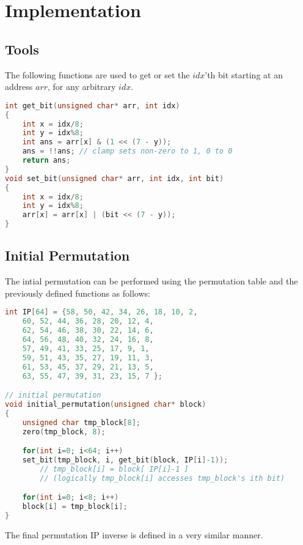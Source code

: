 \documentclass{article}
\begin{document}


\section{Implementation}
\subsection{Tools}
The following functions are used to get or set the $idx$'th bit starting at an address $arr$, for any arbitrary $idx$.
\begin{lstlisting}[language=c]
int get_bit(unsigned char* arr, int idx)
{
    int x = idx/8;
    int y = idx%8;
    int ans = arr[x] & (1 << (7 - y));
    ans = !!ans; // clamp sets non-zero to 1, 0 to 0
    return ans;
}
void set_bit(unsigned char* arr, int idx, int bit)
{
    int x = idx/8;
    int y = idx%8;
    arr[x] = arr[x] | (bit << (7 - y));
}
\end{lstlisting}

\subsection{Initial Permutation}
The intial permutation can be performed using the permutation table and the previously defined functions as follows:
\begin{lstlisting}[language=c]
int IP[64] = {58, 50, 42, 34, 26, 18, 10, 2,
    60, 52, 44, 36, 28, 20, 12, 4,
    62, 54, 46, 38, 30, 22, 14, 6,
    64, 56, 48, 40, 32, 24, 16, 8,
    57, 49, 41, 33, 25, 17, 9, 1,
    59, 51, 43, 35, 27, 19, 11, 3,
    61, 53, 45, 37, 29, 21, 13, 5,
    63, 55, 47, 39, 31, 23, 15, 7 };

// initial permutation
void initial_permutation(unsigned char* block)
{
    unsigned char tmp_block[8];
    zero(tmp_block, 8);

    for(int i=0; i<64; i++)
	set_bit(tmp_block, i, get_bit(block, IP[i]-1));
        // tmp_block[i] = block[ IP[i]-1 ]
        // (logically tmp_block[i] accesses tmp_block's ith bit)

    for(int i=0; i<8; i++)
	block[i] = tmp_block[i];
}
\end{lstlisting}
The final permutation IP inverse is defined in a very similar manner.
\end{document}
